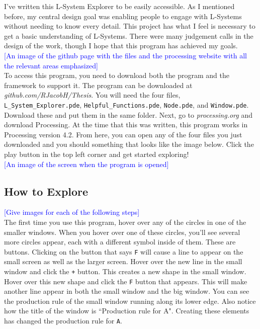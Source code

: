 \documentclass[12pt,twoside]{reedthesis}
\newcommand{\code}[1]{\texttt{#1}}
\begin{document}
	I've written this L-System Explorer to be easily accessible. As I mentioned before, my central design goal was enabling people to engage with L-Systems without needing to know every detail. This project has what I feel is necessary to get a basic understanding of L-Systems. There were many judgement calls in the design of the work, though I hope that this program has achieved my goals.\\
	
	\textcolor{blue}{[An image of the github page with the files and the processing website with all the relevant areas emphasized]}\\
	
	To access this program, you need to download both the program and the framework to support it. The program can be downloaded at \textit{github.com/RJacobH/Thesis}. You will need the four files, \code{L\_System\_Explorer.pde}, \code{Helpful\_Functions.pde}, \code{Node.pde}, and \code{Window.pde}. Download these and put them in the same folder. Next, go to \textit{processing.org} and download Processing. At the time that this was written, this program works in Processing version 4.2. From here, you can open any of the four files you just downloaded and you should something that looks like the image below. Click the play button in the top left corner and get started exploring!\\
	
	\textcolor{blue}{[An image of the screen when the program is opened]}
	
\subsection{How to Explore}
	
	
	\textcolor{blue}{[Give images for each of the following steps]}\\
	
	The first time you use this program, hover over any of the circles in one of the smaller windows. When you hover over one of these circles, you'll see several more circles appear, each with a different symbol inside of them. These are buttons. Clicking on the button that says \code{F} will cause a line to appear on the small screen as well as the larger screen. Hover over the new line in the small window and click the \code{+} button. This creates a new shape in the small window. Hover over this new shape and click the \code{F} button that appears. This will make another line appear in both the small window and the big window. You can see the production rule of the small window running along its lower edge. Also notice how the title of the window is ``Production rule for A". Creating these elements has changed the production rule for \code{A}.\\
	
\end{document}
